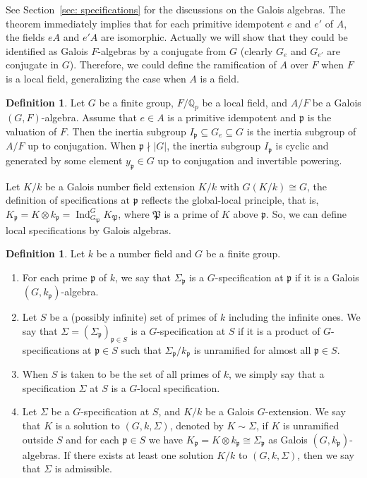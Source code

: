 \documentclass[12pt,a4paper]{amsart}
\numberwithin{equation}{section}%
\theoremstyle{plain}%
\theoremstyle{definition}%
\newtheorem{definition}[theorem]{Definition}%
\theoremstyle{remark}%
\begin{document}
	See Section~\ref{sec: specifications} for the discussions on the Galois algebras.
	The theorem immediately implies that for each primitive idempotent $e$ and $e'$ of $A$, the fields $eA$ and $e'A$ are isomorphic.
	Actually we will show that they could be identified as Galois $F$-algebras by a conjugate from $G$ (clearly $G_e$ and $G_{e'}$ are conjugate in $G$).
	Therefore, we could define the ramification of $A$ over $F$ when $F$ is a local field, generalizing the case when $A$ is a field.
	\begin{definition}\label{def: ramification of Galois algebra}
		Let $G$ be a finite group, $F/\mathbb{Q}_p$ be a local field, and $A/F$ be a Galois $(G,F)$-algebra.
		Assume that $e\in A$ is a primitive idempotent and $\mathfrak{p}$ is the valuation of $F$.
		Then the inertia subgroup $I_{\mathfrak{p}}\subseteq G_e\subseteq G$ is the inertia subgroup of $A/F$ up to conjugation.
		When $\mathfrak{p}\nmid\lvert G\rvert$, the inertia subgroup $I_{\mathfrak{p}}$ is cyclic and generated by some element $y_{\mathfrak{p}}\in G$ up to conjugation and invertible powering.		
	\end{definition}
	Let $K/k$ be a Galois number field extension $K/k$ with $G(K/k)\cong G$, the definition of specifications at $\mathfrak{p}$ reflects the global-local principle, that is, $K_{\mathfrak{p}}=K\otimes k_{\mathfrak{p}}=\operatorname{Ind}^G_{G_{\mathfrak{P}}}K_{\mathfrak{P}}$, where $\mathfrak{P}$ is a prime of $K$ above $\mathfrak{p}$.
	So, we can define local specifications by Galois algebras.
	\begin{definition}\label{def: local specification}
		Let $k$ be a number field and $G$ be a finite group.
		\begin{enumerate}
			\item For each prime $\mathfrak{p}$ of $k$, we say that $\Sigma_{\mathfrak{p}}$ is a $G$-specification at $\mathfrak{p}$ if it is a Galois $(G,k_{\mathfrak{p}})$-algebra.
			\item Let $S$ be a (possibly infinite) set of primes of $k$ including the infinite ones.
			We say that $\Sigma=(\Sigma_{\mathfrak{p}})_{\mathfrak{p}\in S}$ is a $G$-specification at $S$ if it is a product of $G$-specifications at $\mathfrak{p}\in S$ such that $\Sigma_{\mathfrak{p}}/k_{\mathfrak{p}}$ is unramified for almost all $\mathfrak{p}\in S$.
			\item When $S$ is taken to be the set of all primes of $k$, we simply say that a specification $\Sigma$ at $S$ is a $G$-local specification.
			\item Let $\Sigma$ be a $G$-specification at $S$, and $K/k$ be a Galois $G$-extension.
			We say that $K$ is a solution to $(G,k,\Sigma)$, denoted by $K\sim\Sigma$, if $K$ is unramified outside $S$ and for each $\mathfrak{p}\in S$ we have $K_{\mathfrak{p}}=K\otimes k_{\mathfrak{p}}\cong\Sigma_{\mathfrak{p}}$ as Galois $(G,k_{\mathfrak{p}})$-algebras.
			If there exists at least one solution $K/k$ to $(G,k,\Sigma)$, then we say that $\Sigma$ is admissible.
		\end{enumerate}
	\end{definition}	
\end{document}
